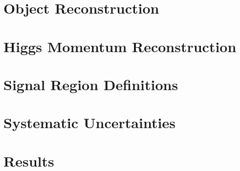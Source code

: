 \documentclass[NOTE, atlasdraft=true, texlive=2016, UKenglish]{\ATLASLATEXPATH atlasdoc}
\begin{document}

\section{Object Reconstruction}
\label{sec:objReco}



\section{Higgs Momentum Reconstruction}
\label{sec:mva}



\section{Signal Region Definitions}
\label{sec:signal_region}



%


\section{Systematic Uncertainties}
\label{sec:sys}


                                                                
\section{Results}
\label{sec:results}


\end{document}
